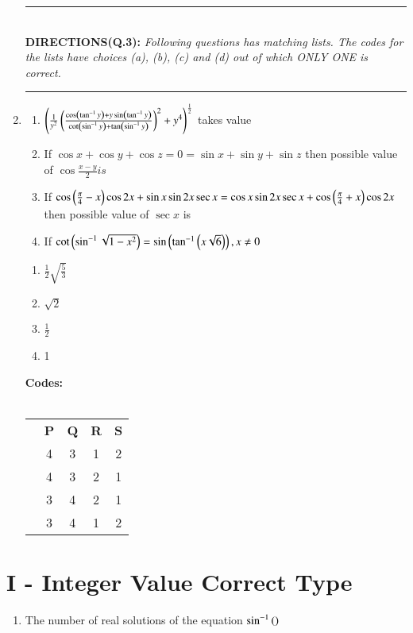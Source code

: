 \documentclass[journal,12pt,twocolumn]{IEEEtran}
\theoremstyle{remark}
\begin{document}
\begin{enumerate}
	\hrule
		\text{}\\
		\textbf{DIRECTIONS(Q.3): }\textit{Following questions has matching lists. The codes for the lists have choices (a), (b), (c) and (d) out of which ONLY ONE is correct.}\\
	\hrule

	\item{
		\begin{multicols}{2}
			\begin{enumerate}
				\item{$\left(\frac{1}{y^2}\left(\frac{\cos\left(\tan^{-1}y\right)+y\sin\left(\tan^{-1}y\right)}{\cot\left(\sin^{-1}y\right)+\tan\left(\sin^{-1}y\right)}\right)^2 + y^4\right)^\frac{1}{2}$} takes value\\
				\item{If $\cos x+\cos y+\cos z = 0 = \sin x+\sin y+\sin z$ then possible value of $\cos\frac{x-y}{2} is$}\\
				\item{If $\cos\left(\frac{\pi}{4}-x\right) \cos 2x+\sin x\sin 2x\sec x=\cos x\sin 2x\sec x+\cos\left(\frac{\pi}{4}+x\right)\cos 2x$ then possible value of $\sec x$ is}\\
				\item{If $\cot\left(\sin^{-1}\sqrt{1-x^2}\right)=\sin\left(\tan^{-1}\left(x\sqrt{6}\right)\right),x\neq 0$}
			\end{enumerate}
			\columnbreak
			\begin{enumerate}
				\item{$\frac{1}{2}\sqrt{\frac{5}{3}}$}\\
				\item{$\sqrt{2}$}\\
				\item{$\frac{1}{2}$}\\
				\item{1}
			\end{enumerate}
		\end{multicols}
		\textbf{Codes:}\\
		\\
		\begin{tabular}{c c c c c}
			& \textbf{P} & \textbf{Q} & \textbf{R} & \textbf{S} \\
			\brak{a} & 4 & 3 & 1 & 2 \\
			\brak{b} & 4 & 3 & 2 & 1 \\
			\brak{c} & 3 & 4 & 2 & 1 \\
			\brak{d} & 3 & 4 & 1 & 2 \\
		\end{tabular}
		}
\end{enumerate}

\section*{I - Integer Value Correct Type}
\begin{enumerate}
\item{
		The number of real solutions of the equation $\sin ^{-1}\left(\right)$
	}
\end{enumerate}
\end{document}
